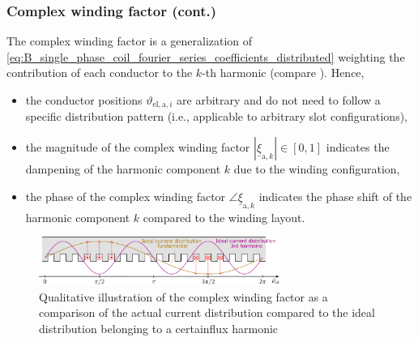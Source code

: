 \begin{frame}
	\frametitle{Complex winding factor (cont.)}
    The complex winding factor is a generalization of \eqref{eq:B_single_phase_coil_fourier_series_coefficients_distributed} weighting the contribution of each conductor to the $k$-th harmonic (compare ). Hence,
    \begin{itemize}
        \item the conductor positions $\vartheta_{\mathrm{el},\mathrm{a},i}$ are arbitrary and do not need to follow a specific distribution pattern (i.e., applicable to arbitrary slot configurations),
        \item the magnitude of the complex winding factor $|\underline{\xi}_{\mathrm{a},k}|\in[0,1]$ indicates the dampening of the harmonic component $k$ due to the winding configuration,
        \item the phase of the complex winding factor $\angle \underline{\xi}_{\mathrm{a},k}$ indicates the phase shift of the harmonic component $k$ compared to the winding layout. 
    \end{itemize}

    \begin{figure}
        \centering
        \includegraphics[width=0.7\textwidth]{fig/lec05/Representation_complex_winding_factor.pdf}
        \caption{Qualitative illustration of the complex winding factor as a comparison of the actual current distribution compared to the ideal distribution belonging to a certainflux harmonic}
        \label{fig:Representation_complex_winding_factor}
    \end{figure}
\end{frame}

